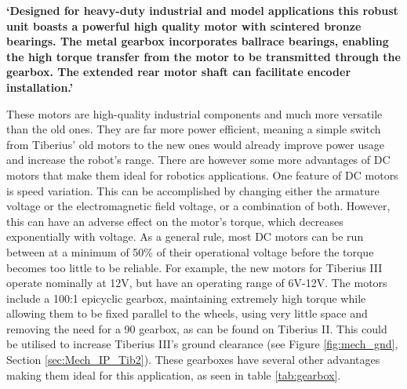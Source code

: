\begin{displayquote}
\textbf{`Designed for heavy-duty industrial and model applications this robust unit boasts a powerful high quality motor with \gls{scintered} bronze bearings. The metal gearbox incorporates ballrace bearings, enabling the high torque transfer from the motor to be transmitted through the gearbox. The extended rear motor shaft can facilitate encoder installation.'}\cite{Dun_comodrills}
\newline
\end{displayquote}
These motors are high-quality industrial components and much more versatile than the old ones. They are far more power efficient, meaning a simple switch from Tiberius' old motors to the new ones would already improve power usage and increase the robot's range. There are however some more advantages of DC motors that make them ideal for robotics applications.
\newline
One feature of DC motors is speed variation. This can be accomplished by changing either the \gls{armature} voltage or the electromagnetic field voltage, or a combination of both. However, this can have an adverse effect on the motor's torque, which decreases exponentially with voltage. As a general rule, most DC motors can be run between at a minimum of 50\% of their operational voltage before the torque becomes too little to be reliable. For example, the new motors for Tiberius III operate nominally at 12V, but have an operating range of 6V-12V. \cite{Dun_dcmotor}
\newline
The motors include a 100:1 \gls{epicyclic gearbox}, maintaining extremely high torque while allowing them to be fixed parallel to the wheels, using very little space and removing the need for a 90\degree{} gearbox, as can be found on Tiberius II. This could be utilised to increase Tiberius III's ground clearance (see Figure \ref{fig:mech_gnd}, Section \ref{sec:Mech_IP_Tib2}).
\newline
These gearboxes have several other advantages making them ideal for this application, as seen in table \ref{tab:gearbox}.

